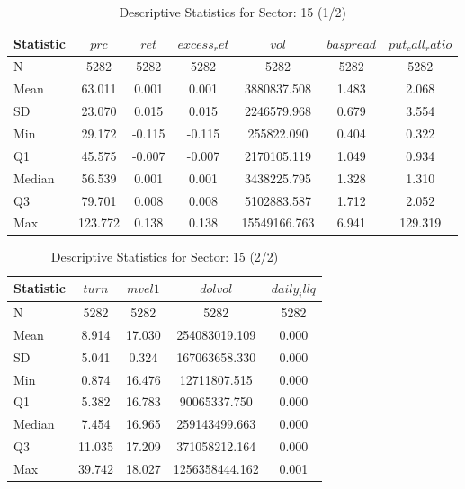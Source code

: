     \begin{table}[ht]
    \centering

    
    \caption{Descriptive Statistics for Sector: 15 (1/2)}
    \label{tab:sec15_a}
    
    \begin{tabular}{lcccccc}
    \toprule
    Statistic & $prc$ & $ret$ & $excess_ret$ & $vol$ & $baspread$ & $put_call_ratio$ \\\midrule
    N & 5282 & 5282 & 5282 & 5282 & 5282 & 5282 \\
    Mean & 63.011 & 0.001 & 0.001 & 3880837.508 & 1.483 & 2.068 \\
    SD & 23.070 & 0.015 & 0.015 & 2246579.968 & 0.679 & 3.554 \\
    Min & 29.172 & -0.115 & -0.115 & 255822.090 & 0.404 & 0.322 \\
    Q1 & 45.575 & -0.007 & -0.007 & 2170105.119 & 1.049 & 0.934 \\
    Median & 56.539 & 0.001 & 0.001 & 3438225.795 & 1.328 & 1.310 \\
    Q3 & 79.701 & 0.008 & 0.008 & 5102883.587 & 1.712 & 2.052 \\
    Max & 123.772 & 0.138 & 0.138 & 15549166.763 & 6.941 & 129.319 \\
    \bottomrule
    \end{tabular}

    \end{table}
    
    \begin{table}[ht]
    \centering

    
    \caption{Descriptive Statistics for Sector: 15 (2/2)}
    \label{tab:sec15_b}
    
    \begin{tabular}{lcccc}
    \toprule
    Statistic & $turn$ & $mvel1$ & $dolvol$ & $daily_illq$ \\\midrule
    N & 5282 & 5282 & 5282 & 5282 \\
    Mean & 8.914 & 17.030 & 254083019.109 & 0.000 \\
    SD & 5.041 & 0.324 & 167063658.330 & 0.000 \\
    Min & 0.874 & 16.476 & 12711807.515 & 0.000 \\
    Q1 & 5.382 & 16.783 & 90065337.750 & 0.000 \\
    Median & 7.454 & 16.965 & 259143499.663 & 0.000 \\
    Q3 & 11.035 & 17.209 & 371058212.164 & 0.000 \\
    Max & 39.742 & 18.027 & 1256358444.162 & 0.001 \\
    \bottomrule
    \end{tabular}

    \end{table}
    
